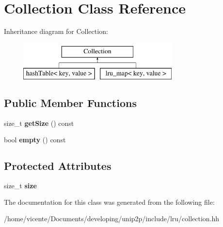 \hypertarget{classCollection}{\section{\-Collection \-Class \-Reference}
\label{classCollection}
}
\-Inheritance diagram for \-Collection\-:\begin{figure}[H]
\begin{center}
\leavevmode
\includegraphics[height=2.000000cm]{classCollection}
\end{center}
\end{figure}
\subsection*{\-Public \-Member \-Functions}
\begin{DoxyCompactItemize}
\item 
\hypertarget{classCollection_a664584261c5541a1c793619e2bf8b1ef}{size\-\_\-t {\bfseries get\-Size} () const }\label{classCollection_a664584261c5541a1c793619e2bf8b1ef}

\item 
\hypertarget{classCollection_a71848cee4aacd23f0e696195e9904ecf}{bool {\bfseries empty} () const }\label{classCollection_a71848cee4aacd23f0e696195e9904ecf}

\end{DoxyCompactItemize}
\subsection*{\-Protected \-Attributes}
\begin{DoxyCompactItemize}
\item 
\hypertarget{classCollection_a9d1519fa6606685f3d8678fb420ee6f3}{size\-\_\-t {\bfseries size}}\label{classCollection_a9d1519fa6606685f3d8678fb420ee6f3}

\end{DoxyCompactItemize}


\-The documentation for this class was generated from the following file\-:\begin{DoxyCompactItemize}
\item 
/home/vicente/\-Documents/developing/unip2p/include/lru/collection.\-hh\end{DoxyCompactItemize}
